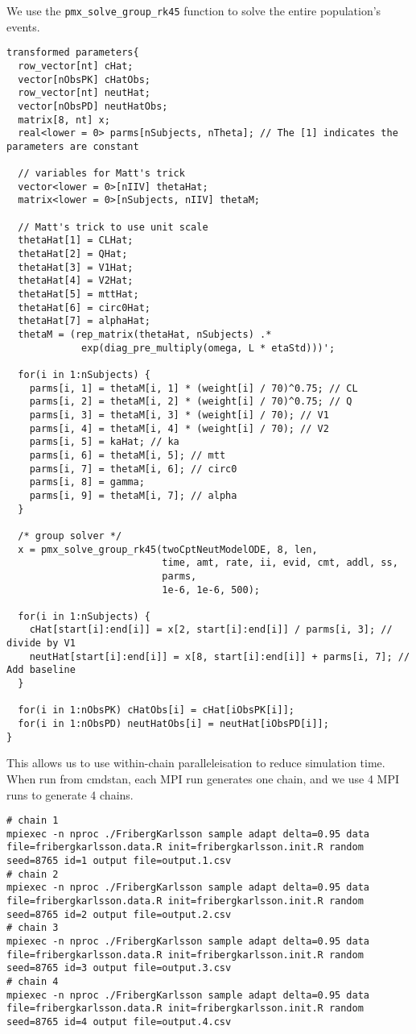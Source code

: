 \documentclass[12pt, reqno, oneside]{amsbook}
\numberwithin{equation}{chapter}
\numberwithin{figure}{chapter}
\numberwithin{table}{chapter}
\theoremstyle{remark}
\begin{document}
We use the \texttt{pmx\_solve\_group\_rk45} function to
solve the entire population's events.
\begin{verbatim}
transformed parameters{
  row_vector[nt] cHat;
  vector[nObsPK] cHatObs;
  row_vector[nt] neutHat;
  vector[nObsPD] neutHatObs;
  matrix[8, nt] x;
  real<lower = 0> parms[nSubjects, nTheta]; // The [1] indicates the parameters are constant

  // variables for Matt's trick
  vector<lower = 0>[nIIV] thetaHat;
  matrix<lower = 0>[nSubjects, nIIV] thetaM;

  // Matt's trick to use unit scale
  thetaHat[1] = CLHat;
  thetaHat[2] = QHat;
  thetaHat[3] = V1Hat;
  thetaHat[4] = V2Hat;
  thetaHat[5] = mttHat;
  thetaHat[6] = circ0Hat;
  thetaHat[7] = alphaHat;
  thetaM = (rep_matrix(thetaHat, nSubjects) .*
             exp(diag_pre_multiply(omega, L * etaStd)))';

  for(i in 1:nSubjects) {
    parms[i, 1] = thetaM[i, 1] * (weight[i] / 70)^0.75; // CL
    parms[i, 2] = thetaM[i, 2] * (weight[i] / 70)^0.75; // Q
    parms[i, 3] = thetaM[i, 3] * (weight[i] / 70); // V1
    parms[i, 4] = thetaM[i, 4] * (weight[i] / 70); // V2
    parms[i, 5] = kaHat; // ka
    parms[i, 6] = thetaM[i, 5]; // mtt
    parms[i, 7] = thetaM[i, 6]; // circ0
    parms[i, 8] = gamma;
    parms[i, 9] = thetaM[i, 7]; // alpha
  }

  /* group solver */
  x = pmx_solve_group_rk45(twoCptNeutModelODE, 8, len,
                           time, amt, rate, ii, evid, cmt, addl, ss,
                           parms,
                           1e-6, 1e-6, 500);

  for(i in 1:nSubjects) {
    cHat[start[i]:end[i]] = x[2, start[i]:end[i]] / parms[i, 3]; // divide by V1
    neutHat[start[i]:end[i]] = x[8, start[i]:end[i]] + parms[i, 7]; // Add baseline
  }

  for(i in 1:nObsPK) cHatObs[i] = cHat[iObsPK[i]];
  for(i in 1:nObsPD) neutHatObs[i] = neutHat[iObsPD[i]];
}
\end{verbatim}

This allows us to use within-chain paralleleisation to reduce
simulation time. When run from cmdstan, each MPI run generates one
chain, and we use 4 MPI runs to generate 4 chains.
\begin{verbatim}
# chain 1
mpiexec -n nproc ./FribergKarlsson sample adapt delta=0.95 data file=fribergkarlsson.data.R init=fribergkarlsson.init.R random seed=8765 id=1 output file=output.1.csv
# chain 2
mpiexec -n nproc ./FribergKarlsson sample adapt delta=0.95 data file=fribergkarlsson.data.R init=fribergkarlsson.init.R random seed=8765 id=2 output file=output.2.csv
# chain 3
mpiexec -n nproc ./FribergKarlsson sample adapt delta=0.95 data file=fribergkarlsson.data.R init=fribergkarlsson.init.R random seed=8765 id=3 output file=output.3.csv
# chain 4
mpiexec -n nproc ./FribergKarlsson sample adapt delta=0.95 data file=fribergkarlsson.data.R init=fribergkarlsson.init.R random seed=8765 id=4 output file=output.4.csv
\end{verbatim}
\end{document}
